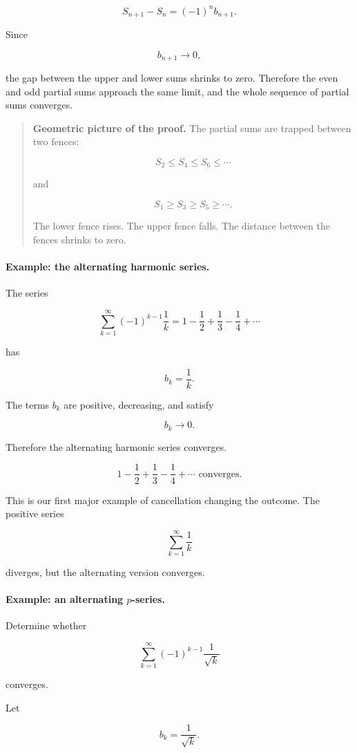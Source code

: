 \[
S_{n+1}-S_n=(-1)^n b_{n+1}.
\]

Since

\[
b_{n+1}\to0,
\]

the gap between the upper and lower sums shrinks to zero.  Therefore the even and odd
partial sums approach the same limit, and the whole sequence of partial sums converges.

\begin{quote}
\textbf{Geometric picture of the proof.}
The partial sums are trapped between two fences:

\[
S_2\le S_4\le S_6\le\cdots
\]

and

\[
S_1\ge S_3\ge S_5\ge\cdots.
\]

The lower fence rises.  The upper fence falls.  The distance between the fences shrinks
to zero.
\end{quote}

\paragraph{Example: the alternating harmonic series.}
The series

\[
\sum_{k=1}^{\infty}(-1)^{k-1}\frac1k
=
1-\frac12+\frac13-\frac14+\cdots
\]

has

\[
b_k=\frac1k.
\]

The terms \(b_k\) are positive, decreasing, and satisfy

\[
b_k\to0.
\]

Therefore the alternating harmonic series converges.

\[
\boxed{
1-\frac12+\frac13-\frac14+\cdots \text{ converges.}
}
\]

This is our first major example of cancellation changing the outcome.  The positive
series

\[
\sum_{k=1}^{\infty}\frac1k
\]

diverges, but the alternating version converges.

\paragraph{Example: an alternating \(p\)-series.}
Determine whether

\[
\sum_{k=1}^{\infty}(-1)^{k-1}\frac1{\sqrt{k}}
\]

converges.

Let

\[
b_k=\frac1{\sqrt{k}}.
\]


